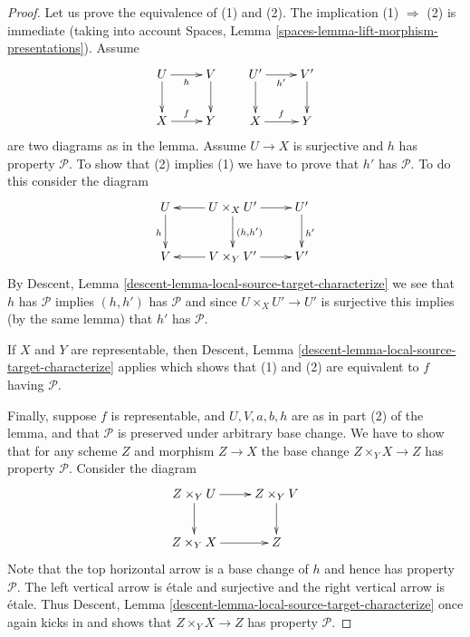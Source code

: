 \documentclass[10pt,a4paper]{amsart}
\theoremstyle{plain}
\theoremstyle{definition}
\theoremstyle{remark}
\numberwithin{equation}{subsection}
\begin{document}
\begin{proof}
Let us prove the equivalence of (1) and (2).
The implication (1) $\Rightarrow$ (2) is immediate (taking into account
Spaces, Lemma \ref{spaces-lemma-lift-morphism-presentations}).
Assume
$$
\xymatrix{
U \ar[d] \ar[r]_h & V \ar[d] \\
X \ar[r]^f & Y
}
\quad\quad
\xymatrix{
U' \ar[d] \ar[r]_{h'} & V' \ar[d] \\
X \ar[r]^f & Y
}
$$
are two diagrams as in the lemma. Assume $U \to X$ is
surjective and $h$ has property $\mathcal{P}$. To show that (2)
implies (1) we have to prove that $h'$ has $\mathcal{P}$. To do
this consider the diagram
$$
\xymatrix{
U \ar[d]_h &
U \times_X U' \ar[l] \ar[d]^{(h, h')} \ar[r] &
U' \ar[d]^{h'} \\
V &
V \times_Y V' \ar[l] \ar[r] &
V'
}
$$
By
Descent, Lemma \ref{descent-lemma-local-source-target-characterize}
we see that $h$ has $\mathcal{P}$ implies $(h, h')$ has $\mathcal{P}$
and since $U \times_X U' \to U'$ is surjective this implies (by the
same lemma) that $h'$ has $\mathcal{P}$.

\medskip\noindent
If $X$ and $Y$ are representable, then
Descent, Lemma \ref{descent-lemma-local-source-target-characterize}
applies which shows that (1) and (2) are equivalent to $f$ having
$\mathcal{P}$.

\medskip\noindent
Finally, suppose $f$ is representable, and $U, V, a, b, h$ are
as in part (2) of the lemma, and that $\mathcal{P}$ is preserved under
arbitrary base change. We have to show that for any scheme
$Z$ and morphism $Z \to X$ the base change $Z \times_Y X \to Z$
has property $\mathcal{P}$. Consider the diagram
$$
\xymatrix{
Z \times_Y U \ar[d] \ar[r] &
Z \times_Y V \ar[d] \\
Z \times_Y X \ar[r] &
Z
}
$$
Note that the top horizontal arrow is a base change of $h$ and
hence has property $\mathcal{P}$. The left vertical arrow is \'etale
and surjective and the right vertical arrow is \'etale. Thus
Descent, Lemma \ref{descent-lemma-local-source-target-characterize}
once again kicks in and shows that $Z \times_Y X \to Z$
has property $\mathcal{P}$.
\end{proof}
\end{document}
